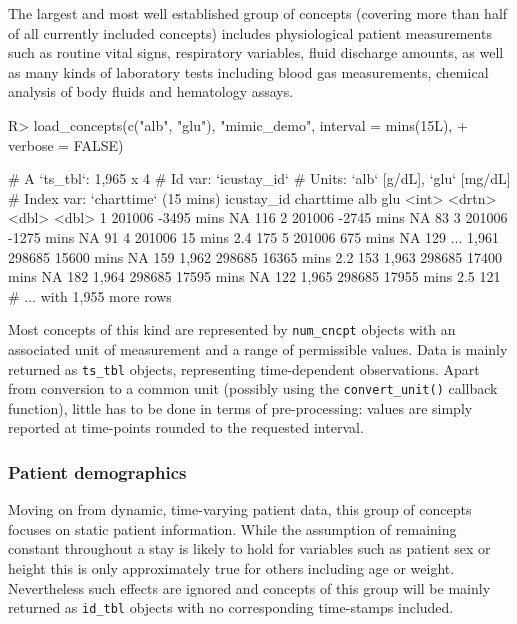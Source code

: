 \documentclass[
]{jss}
\begin{document}
The largest and most well established group of concepts (covering more
than half of all currently included concepts) includes physiological
patient measurements such as routine vital signs, respiratory variables,
fluid discharge amounts, as well as many kinds of laboratory tests
including blood gas measurements, chemical analysis of body fluids and
hematology assays.

\begin{CodeChunk}
\begin{CodeInput}
R> load_concepts(c("alb", "glu"), "mimic_demo", interval = mins(15L),
+               verbose = FALSE)
\end{CodeInput}
\begin{CodeOutput}
# A `ts_tbl`: 1,965 x 4
# Id var:     `icustay_id`
# Units:      `alb` [g/dL], `glu` [mg/dL]
# Index var:  `charttime` (15 mins)
      icustay_id charttime    alb   glu
           <int> <drtn>     <dbl> <dbl>
    1     201006 -3495 mins  NA     116
    2     201006 -2745 mins  NA      83
    3     201006 -1275 mins  NA      91
    4     201006    15 mins   2.4   175
    5     201006   675 mins  NA     129
  ...
1,961     298685 15600 mins  NA     159
1,962     298685 16365 mins   2.2   153
1,963     298685 17400 mins  NA     182
1,964     298685 17595 mins  NA     122
1,965     298685 17955 mins   2.5   121
# ... with 1,955 more rows
\end{CodeOutput}
\end{CodeChunk}

Most concepts of this kind are represented by \texttt{num\_cncpt}
objects with an associated unit of measurement and a range of
permissible values. Data is mainly returned as \texttt{ts\_tbl} objects,
representing time-dependent observations. Apart from conversion to a
common unit (possibly using the \texttt{convert\_unit()} callback
function), little has to be done in terms of pre-processing: values are
simply reported at time-points rounded to the requested interval.

\hypertarget{patient-demographics}{%
\subsubsection{Patient demographics}\label{patient-demographics}}

Moving on from dynamic, time-varying patient data, this group of
concepts focuses on static patient information. While the assumption of
remaining constant throughout a stay is likely to hold for variables
such as patient sex or height this is only approximately true for others
including age or weight. Nevertheless such effects are ignored and
concepts of this group will be mainly returned as \texttt{id\_tbl}
objects with no corresponding time-stamps included.
\end{document}
